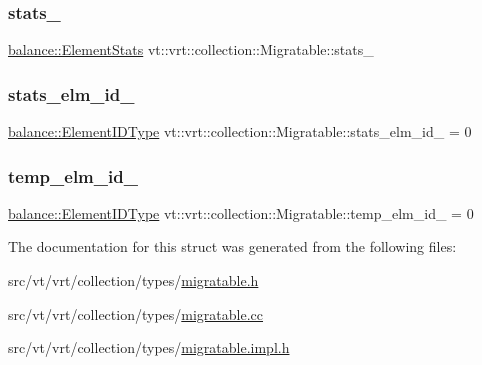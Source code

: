 \subsubsection{\texorpdfstring{stats\+\_\+}{stats\_}}
{\footnotesize\ttfamily \hyperlink{structvt_1_1vrt_1_1collection_1_1balance_1_1_element_stats}{balance\+::\+Element\+Stats} vt\+::vrt\+::collection\+::\+Migratable\+::stats\+\_\+\hspace{0.3cm}{\ttfamily [protected]}}

\mbox{\label{structvt_1_1vrt_1_1collection_1_1_migratable_a5189d4eff453932c6f30f6e870414c1d}} 
\subsubsection{\texorpdfstring{stats\+\_\+elm\+\_\+id\+\_\+}{stats\_elm\_id\_}}
{\footnotesize\ttfamily \hyperlink{namespacevt_1_1vrt_1_1collection_1_1balance_a14c8d2c972f2913aa3f1636e5be0a120}{balance\+::\+Element\+I\+D\+Type} vt\+::vrt\+::collection\+::\+Migratable\+::stats\+\_\+elm\+\_\+id\+\_\+ = 0\hspace{0.3cm}{\ttfamily [protected]}}

\mbox{\label{structvt_1_1vrt_1_1collection_1_1_migratable_a3c8507a7d474295ac3d5b84e59e0bd1a}} 
\subsubsection{\texorpdfstring{temp\+\_\+elm\+\_\+id\+\_\+}{temp\_elm\_id\_}}
{\footnotesize\ttfamily \hyperlink{namespacevt_1_1vrt_1_1collection_1_1balance_a14c8d2c972f2913aa3f1636e5be0a120}{balance\+::\+Element\+I\+D\+Type} vt\+::vrt\+::collection\+::\+Migratable\+::temp\+\_\+elm\+\_\+id\+\_\+ = 0\hspace{0.3cm}{\ttfamily [protected]}}



The documentation for this struct was generated from the following files\+:\begin{DoxyCompactItemize}
\item 
src/vt/vrt/collection/types/\hyperlink{migratable_8h}{migratable.\+h}\item 
src/vt/vrt/collection/types/\hyperlink{migratable_8cc}{migratable.\+cc}\item 
src/vt/vrt/collection/types/\hyperlink{migratable_8impl_8h}{migratable.\+impl.\+h}\end{DoxyCompactItemize}
